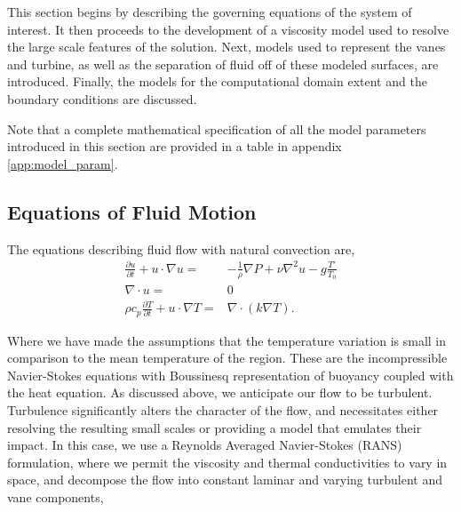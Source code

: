 This section begins by describing the governing equations of the system
of interest. It then proceeds to the development of a viscosity model
used to resolve the large scale features of the solution. Next, models
used to represent the vanes and turbine, as well as the separation of
fluid off of these modeled surfaces, are introduced.  Finally, the
models for the computational domain extent and the boundary conditions
are discussed. 

Note that a complete mathematical specification of all the model
parameters introduced in this section are provided in a table in
appendix \ref{app:model_param}.

\subsection{Equations of Fluid Motion}
%
%

The equations describing fluid flow with natural convection are,
\begin{eqnarray}
 \frac{\partial u}{\partial t} + u \cdot \nabla u =&
  -\frac{1}{\rho}\nabla P + \nu \nabla^2 u - g \frac{T'}{T_0}\\
  \label{eqn:ns_mom}
 \nabla \cdot u =& 0 \\
  \label{eqn:ns_cont}
 \rho c_p \frac{\partial T}{\partial t} + u \cdot \nabla T =& \nabla \cdot ( k \nabla T).
  \label{eqn:ns_en}
\end{eqnarray} 

Where we have made the assumptions that the temperature variation is small in
comparison to the mean temperature of the region. These are the
incompressible Navier-Stokes equations with Boussinesq representation of
buoyancy coupled with the heat equation.  
%
%
%
As discussed above, we anticipate our flow to be
turbulent. Turbulence significantly alters the character of the flow,
and necessitates either resolving the resulting small scales or
providing a model that emulates their impact. In this case, we use a
Reynolds Averaged Navier-Stokes (RANS) formulation, where we 
permit the viscosity and thermal conductivities to vary in space, and
decompose the flow into constant laminar and varying turbulent and vane
components,  


